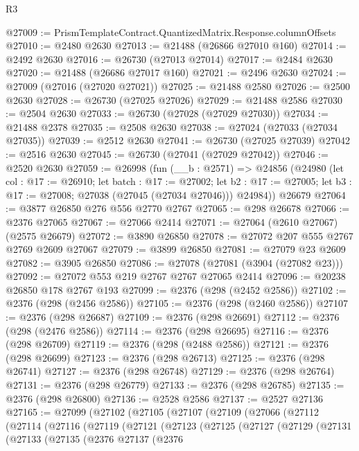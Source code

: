 \begin{lexlean}{R3}
\begin{coremodule}
@27009 := PrismTemplateContract.QuantizedMatrix.Response.columnOffsets
@27010 := @2480 @2630
@27013 := @21488 (@26866 @27010 @160)
@27014 := @2492 @2630
@27016 := @26730 (@27013 @27014)
@27017 := @2484 @2630
@27020 := @21488 (@26686 @27017 @160)
@27021 := @2496 @2630
@27024 := @27009 (@27016 (@27020 @27021))
@27025 := @21488 @2580
@27026 := @2500 @2630
@27028 := @26730 (@27025 @27026)
@27029 := @21488 @2586
@27030 := @2504 @2630
@27033 := @26730 (@27028 (@27029 @27030))
@27034 := @21488 @2378
@27035 := @2508 @2630
@27038 := @27024 (@27033 (@27034 @27035))
@27039 := @2512 @2630
@27041 := @26730 (@27025 @27039)
@27042 := @2516 @2630
@27045 := @26730 (@27041 (@27029 @27042))
@27046 := @2520 @2630
@27059 := @26998
    (fun (__b : @2571) =>
    @24856
      (@24980
        (let col : @17 := @26910;
        let batch : @17 := @27002;
        let b2 : @17 := @27005; let b3 : @17 := @27008; @27038 (@27045 (@27034 @27046)))
        @24984))
    @26679
@27064 := @3877 @26850 @276 @556 @2770 @2767
@27065 := @298 @26678
@27066 := @2376 @27065
@27067 := @27066 @2414
@27071 := @27064 (@2610 @27067) (@2575 @26679)
@27072 := @3890 @26850
@27078 := @27072 @207 @555 @2767 @2769 @2609 @27067
@27079 := @3899 @26850
@27081 := @27079 @23 @2609
@27082 := @3905 @26850
@27086 := @27078 (@27081 (@3904 (@27082 @23)))
@27092 := @27072 @553 @219 @2767 @2767 @27065 @2414
@27096 := @20238 @26850 @178 @2767 @193
@27099 := @2376 (@298 (@2452 @2586))
@27102 := @2376 (@298 (@2456 @2586))
@27105 := @2376 (@298 (@2460 @2586))
@27107 := @2376 (@298 @26687)
@27109 := @2376 (@298 @26691)
@27112 := @2376 (@298 (@2476 @2586))
@27114 := @2376 (@298 @26695)
@27116 := @2376 (@298 @26709)
@27119 := @2376 (@298 (@2488 @2586))
@27121 := @2376 (@298 @26699)
@27123 := @2376 (@298 @26713)
@27125 := @2376 (@298 @26741)
@27127 := @2376 (@298 @26748)
@27129 := @2376 (@298 @26764)
@27131 := @2376 (@298 @26779)
@27133 := @2376 (@298 @26785)
@27135 := @2376 (@298 @26800)
@27136 := @2528 @2586
@27137 := @2527 @27136
@27165 := @27099
    (@27102
      (@27105
        (@27107
          (@27109
            (@27066
              (@27112
                (@27114
                  (@27116
                    (@27119
                      (@27121
                        (@27123
                          (@27125
                            (@27127
                              (@27129
                                (@27131
                                  (@27133
                                    (@27135
                                      (@2376
                                        @27137
                                        (@2376

\end{coremodule}
\end{lexlean}
